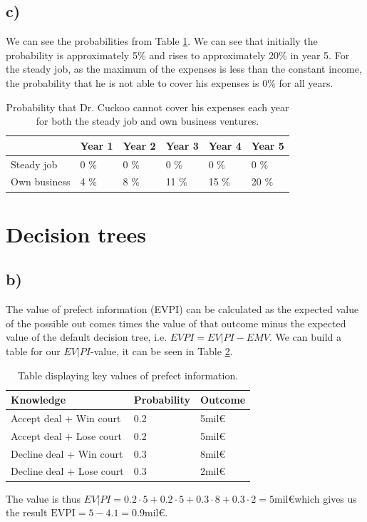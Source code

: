 \documentclass{article}
\begin{document}
\subsection{c)}
	We can see the probabilities from Table \ref{tab:1c}. We can see that initially the probability is approximately 5\% and rises to approximately 20\% in year 5. For the steady job, as the maximum of the expenses is less than the constant income, the probability that he is not able to cover his expenses is 0\% for all years.
	\begin{table}[h]
		\centering
		\caption{Probability that Dr. Cuckoo cannot cover his expenses each year for both the steady job and own business ventures.}
		\label{tab:1c}
		\begin{tabular}{l|l|l|l|l|l|}
			\cline{2-6}
			& Year 1 & Year 2 & Year 3 & Year 4 & Year 5 \\ \hline
			\multicolumn{1}{|l|}{Steady job}   & 0 \%   & 0 \%   & 0 \%   & 0 \%   & 0 \%   \\ \hline
			\multicolumn{1}{|l|}{Own business} & 4 \%   & 8 \%   & 11 \%  & 15 \%  & 20 \%  \\ \hline
		\end{tabular}
	\end{table}
\section{Decision trees}
\subsection{b)}
	The value of prefect information (EVPI) can be calculated as the expected value of the possible out comes times the value of that outcome minus the expected value of the default decision tree, i.e. $EVPI = EV|PI - EMV$.
	We can build a table for our $EV|PI$-value, it can be seen in Table \ref{tab:2b}.
	\begin{table}[h]
		\centering
		\caption{Table displaying key values of prefect information. }
		\label{tab:2b}
		\begin{tabular}{l|l|l}
			Knowledge                 & Probability & Outcome \\ \hline
			Accept deal + Win court   & 0.2         & 5mil\euro   \\
			Accept deal + Lose court  & 0.2         & 5mil\euro   \\
			Decline deal + Win court  & 0.3         & 8mil\euro   \\
			Decline deal + Lose court & 0.3         & 2mil\euro  
		\end{tabular}
	\end{table}
	The value is thus $EV|PI = 0.2\cdot5+0.2\cdot5+0.3\cdot8+0.3\cdot2 = 5$mil\euro which gives us the result $\text{EVPI} = 5 - 4.1 = 0.9$mil\euro.
\end{document}

